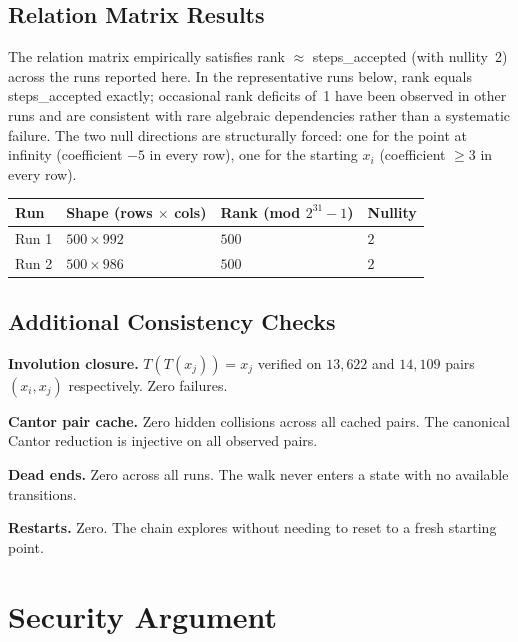 \documentclass[11pt]{article}
\theoremstyle{definition}
\theoremstyle{remark}
\begin{document}
\subsection{Relation Matrix Results}

The relation matrix empirically satisfies rank $\approx$ steps\_accepted (with
nullity~2) across the runs reported here. In the representative runs below,
rank equals steps\_accepted exactly; occasional rank deficits of~1 have been
observed in other runs and are consistent with rare algebraic dependencies
rather than a systematic failure. The two null directions are structurally
forced: one for the point at infinity (coefficient $-5$ in every row), one for
the starting $x_i$ (coefficient $\geq 3$ in every row).

\begin{center}
\begin{tabular}{llll}
  \toprule
  Run & Shape (rows $\times$ cols) & Rank (mod $2^{31}-1$) & Nullity \\
  \midrule
  Run 1 & $500 \times 992$ & $500$ & $2$ \\
  Run 2 & $500 \times 986$ & $500$ & $2$ \\
  \bottomrule
\end{tabular}
\end{center}

\subsection{Additional Consistency Checks}

\textbf{Involution closure.} $T(T(x_j)) = x_j$ verified on $13{,}622$ and
$14{,}109$ pairs $(x_i, x_j)$ respectively. Zero failures.

\textbf{Cantor pair cache.} Zero hidden collisions across all cached pairs. The
canonical Cantor reduction is injective on all observed pairs.

\textbf{Dead ends.} Zero across all runs. The walk never enters a state with no
available transitions.

\textbf{Restarts.} Zero. The chain explores without needing to reset to a fresh
starting point.

\section{Security Argument}
\label{sec:security}
\end{document}
